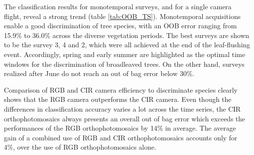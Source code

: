 \documentclass[remotesensing,article,submit,moreauthors,pdftex,12pt,a4paper]{mdpi} %
\begin{document}
The classification results for monotemporal surveys, and for a single camera flight, reveal a strong trend (table \ref{tab:OOB_TS}). 
Monotemporal acquisitions enable a good discrimination of tree species, with an OOB error ranging from 15.9\% to 36.0\% across the diverse vegetation periods. 
The best surveys are shown to be the survey 3, 4 and 2, which were all achieved at the end of the leaf-flushing event. 
Accordingly, spring and early summer are highlighted as the optimal time windows for the discrimination of broadleaved trees. 
On the other hand, surveys realized after June do not reach an out of bag error below 30\%. 

Comparison of RGB and CIR camera efficiency to discriminate species clearly shows that the RGB camera outperforms the CIR camera. Even though the differences in classification accuracy varies a lot across the time series, the CIR orthophotomosaics always presents an overall out of bag error which exceeds the performances of the RGB orthophotomosaics by 14\% in average.
The average gain of a combined use of RGB and CIR orthophotomosaics accounts only for 4\%, over the use of RGB orthophotomosaics alone.
\end{document}
